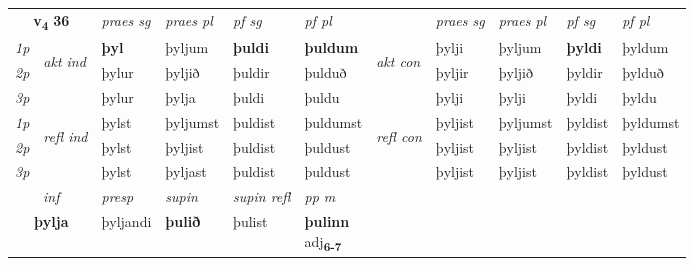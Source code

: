 \noindent
\begin{tabular}{lllllllllll} \toprule
\multicolumn{2}{c}{\textbf{v{\textsubscript{4}}} \Large{\textbf{36}}}  &  \textit{praes sg}  & \textit{praes pl}  &\textit{ pf sg} & \textit{pf pl} &  &  \textit{praes sg}  & \textit{praes pl}  & \textit{pf sg} & \textit{pf pl } \\*
	\cmidrule{3-6} \cmidrule{8-11}
 {\textit{1p}} & \multirow{3}{*}{\begin{turn}{90}\textit{akt ind}\end{turn}} & \textbf{þyl} & þyljum & \textbf{þuldi} & \textbf{þuldum} & \multirow{3}{*}{\begin{turn}{90}\textit{akt con}\end{turn}} &þylji & þyljum & \textbf{þyldi} & þyldum\\*
 {\textit{2p}} &  &  þylur  & þyljið & þuldir & þulduð & & þyljir & þyljið & þyldir & þylduð \\*
{\textit{3p}} &  & þylur & þylja & þuldi & þuldu & & þylji & þylji& þyldi & þyldu \\*
\cmidrule{3-6} \cmidrule{8-11}
 {\textit{1p}} & \multirow{3}{*}{\begin{turn}{90}\textit{refl ind}\end{turn}}  & þylst & þyljumst & þuldist & þuldumst & \multirow{3}{*}{\begin{turn}{90}\textit{refl con}\end{turn}}  &þyljist & þyljumst & þyldist & þyldumst \\*
 {\textit{2p}} &  & þylst & þyljist & þuldist & þuldust & &þyljist & þyljist & þyldist & þyldust \\*
 {\textit{3p}}  & & þylst & þyljast & þuldist & þuldust & & þyljist & þyljist& þyldist & þyldust \\*
\cmidrule{3-6} \cmidrule{8-11}

   \multicolumn{2}{c}{\textit{inf}}     & \textit{presp} & \textit{supin} & \textit{supin refl} & \textit{pp m} \\*
  \multicolumn{2}{c}{\textbf{þylja}}      & þyljandi &  \textbf{þulið} & þulist & \specialcell{\textbf{þulinn} \\ adj\textbf{\textsubscript{6-7}}} \\*
\end{tabular}

